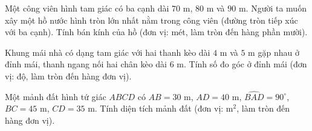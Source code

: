 \begin{bt}%
	Một công viên hình tam giác có ba cạnh dài $70\text{ m}$, $80\text{ m}$ và $90\text{ m}$. Người ta muốn xây một hồ nước hình tròn lớn nhất nằm trong công viên (đường tròn tiếp xúc với ba cạnh). Tính bán kính của hồ (đơn vị: mét, làm tròn đến hàng phần mười).
\end{bt}

\begin{bt}%
	Khung mái nhà có dạng tam giác với hai thanh kèo dài $4\text{ m}$ và $5\text{ m}$ gặp nhau ở đỉnh mái, thanh ngang nối hai chân kèo dài $6\text{ m}$. Tính số đo góc ở đỉnh mái (đơn vị: độ, làm tròn đến hàng đơn vị).
\end{bt}

\begin{bt}%
	Một mảnh đất hình tứ giác $ABCD$ có $AB=30\text{ m}$, $AD=40\text{ m}$, $\widehat{BAD}=90^\circ$, $BC=45\text{ m}$, $CD=35\text{ m}$. Tính diện tích mảnh đất (đơn vị: m$^2$, làm tròn đến hàng đơn vị).
\end{bt}

